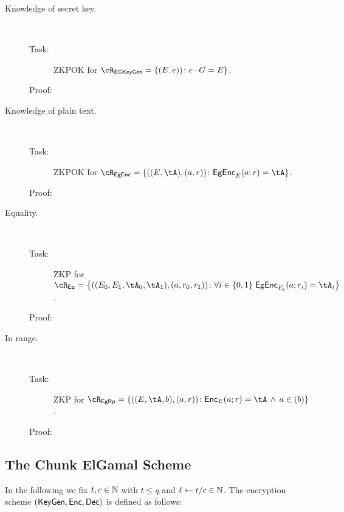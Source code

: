	
\begin{description}
	\item[Knowledge of secret key.] ~
    


\begin{description}
	\item[Task:] ZKPOK for $\rEgKeyGen = \rEgKeyGenDef$.
	
\item[Proof:] 
\end{description}


\item[Knowledge of plain text.] ~

\begin{description}
	\item[Task:] ZKPOK for $\rEGEnc=\rEGEncDef$.
	
	\item[Proof:] 
	
\end{description}


\item[Equality.] ~
\begin{description}
	\item[Task:] ZKP for $\rEgEq =\rEgEqDef$.
	
	\item[Proof:] 
\end{description}


\item[In range.] ~
\begin{description}
	\item[Task:] ZKP for $\rEgRp =\rEgRpDef$.
	
	\item[Proof:] 
\end{description}



\end{description}

	
\subsection{The Chunk ElGamal  Scheme}\label{sec:ChanksEG:EGScheme}
In the following we fix $t,c\in {\mathbb{N}}$ with $t\le q$ and $\ell \leftarrow t/c \in {\mathbb{N}}$. The encryption scheme $(\mathsf{KeyGen},\mathsf{Enc},\mathsf{Dec})$ is defined as follows:

